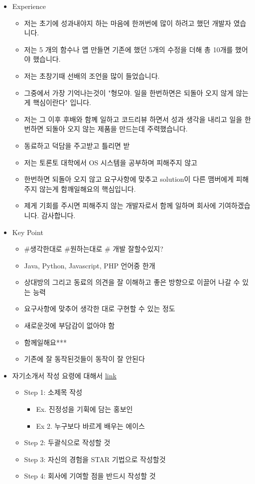 \documentclass[12pt]{article}
\begin{document}
\begin{itemize}
    \item Experience
    \begin{itemize}
        \item 저는 초기에 성과내야지 하는 마음에 한꺼번에 많이 하려고 했던 개발자 였습니다.
        \item 저는 5 개의 함수나 앱 만들면 기존에 했던 5개의 수정을 더해 총 10개를 했어야 했습니다.
        \item 저는 초창기때 선배의 조언을 많이 들었습니다.
        \item 그중에서 가장 기억나는것이 "형모야. 일을 한번하면은 되돌아 오지 않게 않는게 핵심이란다" 입니다.
        \item 저는 그 이후 후배와 함꼐 일하고 코드리뷰 하면서 성과 생각을 내리고 일을 한번하면 되돌아 오지 않는 제품을 만드는데 주력했습니다.
        \item 동료하고 덕담을 주고받고 틀리면 받
        \item 저는 토론토 대학에서 OS 시스템을 공부하며 피해주지 않고
        \item 한번하면 되돌아 오지 않고 요구사항에 맞추고 solution이 다른 맴버에게 피해 주지 않는게 함깨일해요의 핵심입니다.
        \item 제게 기회를 주시면 피해주지 않는 개발자로서 함께 일하며 회사에 기여하겠습니다. 감사합니다.
    \end{itemize}
    \item Key Point
    \begin{itemize}
        \item \#생각한대로 \#원하는대로 \# 개발 잘할수있지?
        \item Java, Python, Javascript, PHP 언어중 한개
        \item 상대방의 그리고 동료의 의견을 잘 이해하고 좋은 방향으로 이끌어 나갈 수 있는 능력
        \item 요구사항에 맞추어 생각한 대로 구현할 수 있는 정도
        \item 새로운것에 부담감이 없아야 함
        \item 함께일해요***

        \item 기존에 잘 동작된것들이 동작이 잘 안된다

    \end{itemize}
    \item 자기소개서 작성 요령에 대해서 \href{https://brunch.co.kr/@hklim/11}{link}
    \begin{itemize}
        \item Step 1: 소제목 작성
        \begin{itemize}
            \item Ex. 진정성을 기휙에 담는 홍보인
            \item Ex 2. 누구보다 바르게 배우는 에이스
        \end{itemize}
        \item Step 2: 두괄식으로 작성할 것
        \item Step 3: 자신의 경험을 STAR 기법으로 작성할것
        \item Step 4: 회사에 기여할 점을 반드시 작성할 것
    \end{itemize}


\end{itemize}
\end{document}
